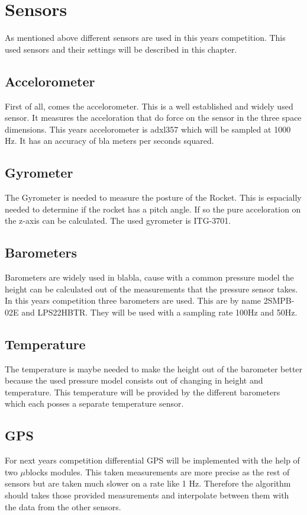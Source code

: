  
 \section{Sensors}
 As mentioned above different sensors are used in this years competition.
 This used sensors and their settings will be described in this chapter.
 
 \subsection{Accelorometer}
 First of all, comes the accelorometer. This is a well established and widely used sensor. It measures the acceloration that do force on the sensor in the three
 space dimensions. This years accelorometer is adxl357 which will be sampled at 1000 Hz. It has an accuracy of bla meters per seconds squared. 
 
 \subsection{Gyrometer}
 The Gyrometer is needed to measure the posture of the Rocket. This is espacially needed to determine if the rocket has a pitch angle. If so the pure
 acceloration on the z-axis can be calculated. The used gyrometer is ITG-3701.
 
 \subsection{Barometers}
 Barometers are widely used in blabla, cause with a common pressure model the height can be calculated out of the measurements that the pressure sensor takes.
 In this years competition three barometers are used. This are by name 2SMPB-02E and LPS22HBTR. They will be used with a sampling rate 100Hz and 50Hz.
 
 \subsection{Temperature}
 The temperature is maybe needed to make the height out of the barometer better because the used pressure model consists out of changing in height and temperature.
 This temperature will be provided by the different barometers which each posses a separate temperature sensor. 
 
 \subsection{GPS}
 For next years competition differential GPS will be implemented with the help of two $\mu$blocks modules.
 This taken measurements are more precise as the rest of sensors but are taken much slower on a rate like 1 Hz. Therefore the algorithm should takes
 those provided measurements and interpolate between them with the data from the other sensors.
 

